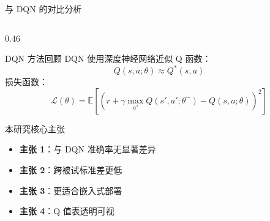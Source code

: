 \begin{frame}{与 DQN 的对比分析}
\begin{columns}[t]
        \begin{column}{0.46\textwidth}
            \vspace{-0.5em}
            \begin{alertblock}{\normalsize DQN 方法回顾}
                \scriptsize
                DQN 使用深度神经网络近似 Q 函数：
                \[Q(s, a; \theta) \approx Q^*(s, a)\]
                损失函数：
                \[\mathcal{L}(\theta) = \mathbb{E}\left[ \left( r + \gamma \max_{a'} Q(s', a'; \theta^-) - Q(s, a; \theta) \right)^2 \right]\]
            \end{alertblock}

            \begin{exampleblock}{\normalsize 本研究核心主张}
                \scriptsize
                \begin{itemize}
                    \item \textbf{主张 1}：与 DQN 准确率无显著差异
                    \item \textbf{主张 2}：跨被试标准差更低
                    \item \textbf{主张 3}：更适合嵌入式部署
                    \item \textbf{主张 4}：Q 值表透明可视
                \end{itemize}
            \end{exampleblock}
        \end{column}
    \end{columns}
\end{frame}

